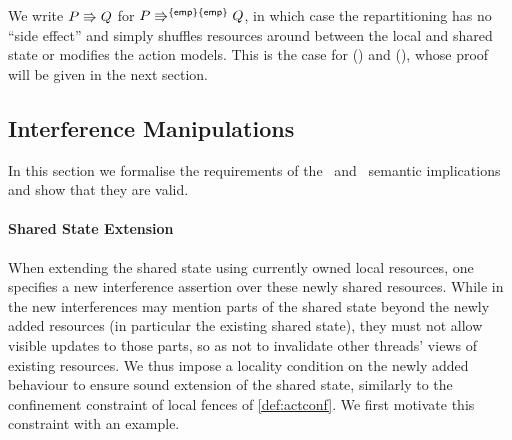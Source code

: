 We write $P \Rrightarrow Q$ for $P\Rrightarrow^{\left\{\mathsf{emp}\right\}\left\{\mathsf{emp}\right\}}Q $, in which case the repartitioning has no ``side effect'' and simply shuffles resources around between the local and shared state or modifies the action models. This is the case for (\shiftRule) and (\extendRule), whose proof will be given in the next section.


\subsection{Interference Manipulations}\label{subsec:extension}
In this section we formalise the requirements of the \extendRule\ and \shiftRule\ semantic implications and show that they are valid.

\paragraph{Shared State Extension}
When extending the shared state using currently owned local resources, one specifies a new interference assertion over these newly shared resources. While in \colosl the new interferences may mention parts of the shared state beyond the newly added resources (in particular the existing shared state), they must not allow visible updates to those parts, so as not to invalidate other threads' views of existing resources. We thus impose a locality condition on the newly added behaviour to ensure sound extension of the shared state, similarly to the confinement constraint of local fences of \ref{def:actconf}. We first motivate this constraint with an example.

